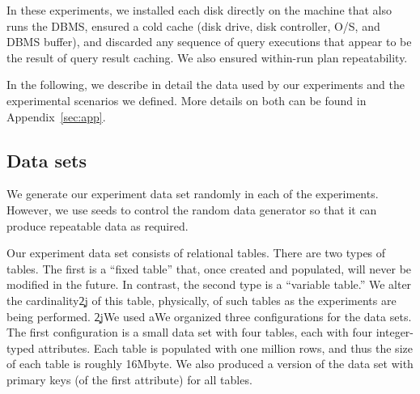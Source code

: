 \documentclass[prodmode,acmtods]{acmsmall}
\begin{document}

In these experiments, we  installed each disk directly
on the machine that also runs the DBMS, ensured a cold cache (disk drive,
disk controller, O/S, and DBMS buffer), and discarded any sequence of query
executions that appear to be the result of query result caching. We also
ensured within-run plan repeatability.

In the following, we describe in detail the data used by our experiments and
the experimental scenarios we defined. More details on both
can be found in Appendix~\ref{sec:app}.

\subsection{Data sets}\label{sec:datasets}
We generate our experiment data set randomly in each of the experiments. However, we
use seeds to control the random data generator so that it can produce
repeatable data as required.

Our experiment data set consists of relational tables. There are two types of
tables. The first is a ``fixed table'' that, once created and
populated, will never be modified in the future.  In contrast, the second
type is a ``variable table.'' We alter the cardinality\c2j{ of
  this table}{, physically, of such tables} as the experiments are being performed. 
\c2j{We used a}{We organized three configurations for the data sets. The first configuration
is a small} data set with four tables, each with four integer-typed
attributes. Each table is populated with one million rows, and thus the size
of each table is roughly 16Mbyte. We also produced a version of the data set with primary
keys (of the first attribute) for all tables.
\end{document}
